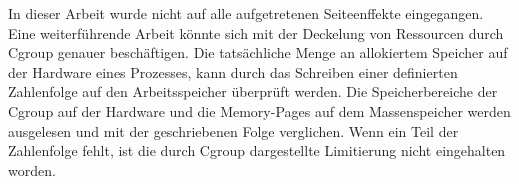 In dieser Arbeit wurde nicht auf alle aufgetretenen Seiteenffekte eingegangen. Eine weiterführende Arbeit könnte sich mit der Deckelung von Ressourcen durch Cgroup genauer beschäftigen. Die tatsächliche Menge an allokiertem Speicher auf der Hardware eines Prozesses, kann durch das Schreiben einer definierten Zahlenfolge auf den Arbeitsspeicher überprüft werden. Die Speicherbereiche der Cgroup auf der Hardware und die Memory-Pages auf dem Massenspeicher werden ausgelesen und mit der geschriebenen Folge verglichen. Wenn ein Teil der Zahlenfolge fehlt, ist die durch Cgroup dargestellte Limitierung nicht eingehalten worden. 

\pagebreak
